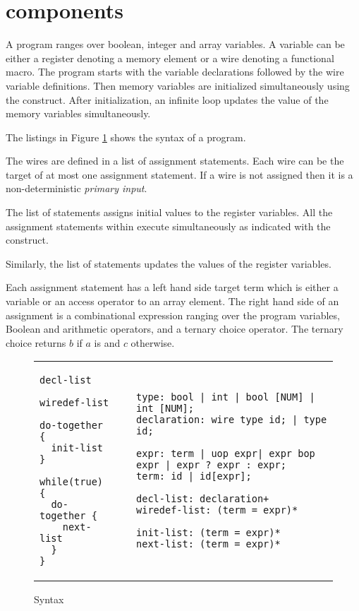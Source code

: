 \section{\caig components}
\label{s:this}
A \caig program ranges over boolean, integer and array variables. 
A variable can be either a register denoting a memory element or a wire denoting a functional macro.
The \caig program starts with the variable declarations followed by the wire variable definitions. 
Then memory variables are initialized simultaneously using the  construct. 
After initialization, an infinite loop updates the value of the memory variables simultaneously. 

The listings in Figure \ref{fig:gr} shows the syntax of a \caig program. 

The wires are defined in a list of assignment statements. 
Each wire can be the target of at most one assignment statement. 
If a wire is not assigned then it is a non-deterministic {\em primary input}. 

The list of statements  assigns initial values to 
the register variables. All the assignment statements within  execute
simultaneously as indicated with the  construct.

Similarly, the  list of statements updates the values 
of the register variables. 

Each assignment statement has a left hand side target term 
which is either a variable or an access operator to an 
array element. 
The right hand side of an assignment is a combinational expression ranging over the program variables,  Boolean and arithmetic operators, and a ternary choice 
operator. The ternary choice  returns $b$ if $a$ 
is \true and $c$ otherwise. 

\begin{figure}
\begin{tabular}{p{3cm}p{0.5cm}p{12cm}}
\begin{lstlisting}
decl-list

wiredef-list

do-together {
  init-list
}

while(true) {
  do-together {
    next-list
  }
}
\end{lstlisting}
&
&
\begin{lstlisting}
type: bool | int | bool [NUM] | int [NUM]; 
declaration: wire type id; | type id;

expr: term | uop expr| expr bop expr | expr ? expr : expr;
term: id | id[expr]; 

decl-list: declaration+
wiredef-list: (term = expr)*

init-list: (term = expr)* 
next-list: (term = expr)* 
\end{lstlisting}
\end{tabular}
\caption{\caig Syntax}
\label{fig:gr}
\end{figure}

